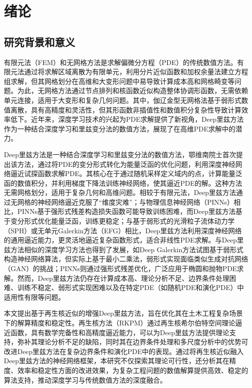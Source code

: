 \documentclass[engineeringmaster]{hquThesis}
\begin{document}
\makecover



\frontmatter{
    
    \tableofcontents
}

\mainmatter
\chapter{绪论}
\section{研究背景和意义}
有限元法（FEM）和无网格方法是求解偏微分方程（PDE）的传统数值方法。有限元法通过将求解区域离散为有限单元，利用分片近似函数和加权余量法建立方程组求解，但其网格划分在高维和大变形问题中易导致计算成本高和网格畸变等问题。为此，无网格方法通过节点排列和核函数近似构造整体协调形函数，无需依赖单元连接，适用于大变形和复杂几何问题。其中，伽辽金型无网格法基于弱形式数值离散，具有高精度和灵活性，但其形函数非插值性和数值积分复杂性导致计算效率低下。近年来，深度学习技术的兴起为PDE求解提供了新视角，Deep里兹方法作为一种结合深度学习和里兹变分法的数值方法，展现了在高维PDE求解中的潜力。

Deep里兹方法是一种结合深度学习和里兹变分法的数值方法，鄂维南院士首次提出该方法，通过将PDE的变分形式转化为能量泛函的优化问题，利用深度神经网络逼近试探函数求解PDE。其核心在于通过随机采样定义域内的点，计算能量泛函的数值积分，并利用梯度下降法训练神经网络，使其逼近PDE的解。这种方法无需网格划分，适用于复杂几何和高维问题。相较于有限元法，Deep里兹方法通过无网格的神经网络逼近克服了“维度灾难”；与物理信息神经网络（PINNs）相比，PINNs基于强形式残差构造损失函数可能导致训练困难，而Deep里兹方法基于变分形式优化能量泛函，训练更稳定；与基于弱形式的光滑粒子流体动力学（SPH）或无单元Galerkin方法（EFG）相比，Deep里兹方法利用深度神经网络的通用逼近能力，更灵活地逼近复杂函数形式，适合非线性PDE求解。与Deep里兹方法相似的深度学习方法也得到了发展，如Deep Galerkin方法试图基于弱形式构造神经网络算法，但实际上基于最小二乘法，弱形式实现面临类似生成对抗网络（GAN）的挑战；PINNs则通过强形式残差优化，广泛应用于椭圆和抛物PDE求解。然而，Deep里兹方法仍存在计算成本高、理论分析不足、边界条件处理困难、训练不稳定、弱形式实现困难以及在特定PDE（如随机PDE和演化PDE）中适用性有限等问题。

本文提出基于再生核近似的增强Deep里兹方法，旨在优化其在土木工程复杂场景下的解算精度和稳定性。再生核方法（RKPM）通过再生核希尔伯特空间理论逼近函数，具有数学完备性和高精度逼近能力，可以为Deep里兹方法提供理论支持，弥补其理论分析不足的缺陷，同时其在边界条件处理和多尺度分析中的优势可改进Deep里兹方法在复杂边界条件和演化PDE中的表现。通过将再生核近似融入Deep里兹方法的神经网络框架，本研究不仅探索其理论可行性，还分析其在精度、效率和稳定性方面的改进效果，为复杂工程问题的数值解算提供高效、稳定的算法支持，推动深度学习与传统数值方法的深度融合。
\end{document}
